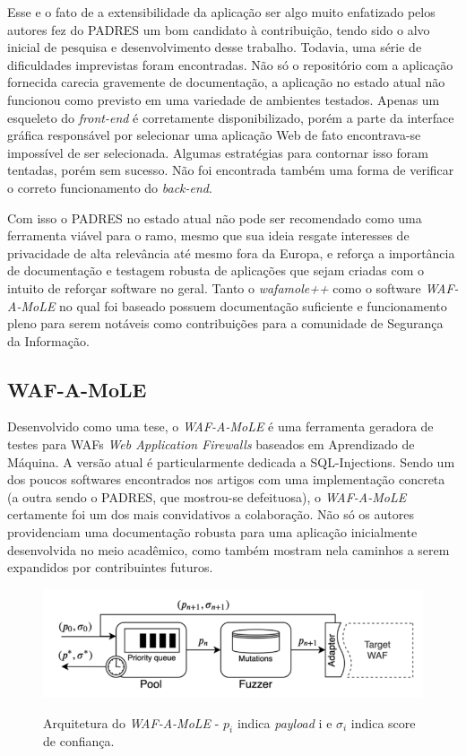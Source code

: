 Esse e o fato de a extensibilidade da aplicação ser algo muito enfatizado pelos autores fez do PADRES um bom candidato à contribuição, tendo sido o alvo inicial de pesquisa e desenvolvimento desse trabalho. Todavia, uma série de dificuldades imprevistas foram encontradas. Não só o repositório com a aplicação fornecida carecia gravemente de documentação, a aplicação no estado atual não funcionou como previsto em uma variedade de ambientes testados. Apenas um esqueleto do \textit{front-end} é corretamente disponibilizado, porém a parte da interface gráfica responsável por selecionar uma aplicação Web de fato encontrava-se impossível de ser selecionada. Algumas estratégias para contornar isso foram tentadas, porém sem sucesso. Não foi encontrada também uma forma de verificar o correto funcionamento do \textit{back-end}.

Com isso o PADRES no estado atual não pode ser recomendado como uma ferramenta viável para o ramo, mesmo que sua ideia resgate interesses de privacidade de alta relevância até mesmo fora da Europa, e reforça a importância de documentação e testagem robusta de aplicações que sejam criadas com o intuito de reforçar software no geral. Tanto o \textit{wafamole++} como o software \textit{WAF-A-MoLE} no qual foi baseado possuem documentação suficiente e funcionamento pleno para serem notáveis como contribuições para a comunidade de Segurança da Informação.

\subsection{WAF-A-MoLE}

Desenvolvido como uma tese, o \textit{WAF-A-MoLE} \cite{valenza_waf--mole_2020} é uma ferramenta geradora de testes para WAFs \textit{Web Application Firewalls} baseados em Aprendizado de Máquina. A versão atual é particularmente dedicada a SQL-Injections. Sendo um dos poucos softwares encontrados nos artigos com uma implementação concreta (a outra sendo o PADRES, que mostrou-se defeituosa), o \textit{WAF-A-MoLE} certamente foi um dos mais convidativos a colaboração. Não só os autores providenciam uma documentação robusta para uma aplicação inicialmente desenvolvida no meio acadêmico, como também mostram nela caminhos a serem expandidos por contribuintes futuros.

\begin{figure}[ht]
    \centering
    \caption{Arquitetura do \textit{WAF-A-MoLE} - $p_i$ indica \textit{payload} i e $\sigma_i$  indica score de confiança.}
    \includegraphics[width=14cm]{figuras/wafamoleArchitecture.png} 
    \label{fig:internet} 
\end{figure}


